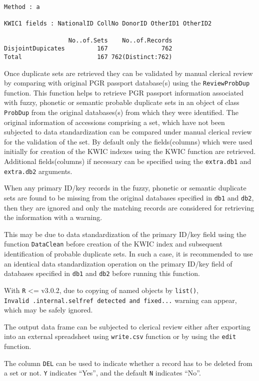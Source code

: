 \documentclass[]{article}
\begin{document}
\begin{verbatim}
Method : a

KWIC1 fields : NationalID CollNo DonorID OtherID1 OtherID2
 
                  No..of.Sets    No..of.Records
DisjointDupicates         167               762
Total                     167 762(Distinct:762)
\end{verbatim}

Once duplicate sets are retrieved they can be validated by manual
clerical review by comparing with original PGR passport database(s)
using the \texttt{ReviewProbDup} function. This function helps to
retrieve PGR passport information associated with fuzzy, phonetic or
semantic probable duplicate sets in an object of class \texttt{ProbDup}
from the original databases(s) from which they were identified. The
original information of accessions comprising a set, which have not been
subjected to data standardization can be compared under manual clerical
review for the validation of the set. By default only the
fields(columns) which were used initially for creation of the KWIC
indexes using the KWIC function are retrieved. Additional
fields(columns) if necessary can be specified using the
\texttt{extra.db1} and \texttt{extra.db2} arguments.

When any primary ID/key records in the fuzzy, phonetic or semantic
duplicate sets are found to be missing from the original databases
specified in \texttt{db1} and \texttt{db2}, then they are ignored and
only the matching records are considered for retrieving the information
with a warning.

This may be due to data standardization of the primary ID/key field
using the function \texttt{DataClean} before creation of the KWIC index
and subsequent identification of probable duplicate sets. In such a
case, it is recommended to use an identical data standardization
operation on the primary ID/key field of databases specified in
\texttt{db1} and \texttt{db2} before running this function.

With \texttt{R} \textless{}= v3.0.2, due to copying of named objects by
\texttt{list()},
\texttt{Invalid\ .internal.selfref\ detected\ and\ fixed...} warning can
appear, which may be safely ignored.

The output data frame can be subjected to clerical review either after
exporting into an external spreadsheet using \texttt{write.csv} function
or by using the \texttt{edit} function.

The column \texttt{DEL} can be used to indicate whether a record has to
be deleted from a set or not. \texttt{Y} indicates ``Yes'', and the
default \texttt{N} indicates ``No''.
\end{document}
